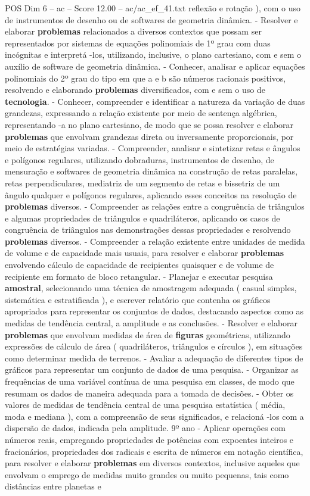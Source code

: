 \begin{textsample}{POS Dim 6 – ac – Score 12.00 – ac/ac\_ef\_41.txt}
reflexão e rotação ), com o uso de instrumentos de desenho ou de softwares de geometria dinâmica. - Resolver e elaborar \textbf{problemas} relacionados a diversos contextos que possam ser representados por sistemas de equações polinomiais de 1º grau com duas incógnitas e interpretá -los, utilizando, inclusive, o plano cartesiano, com e sem o auxílio de software de geometria dinâmica. - Conhecer, analisar e aplicar equações polinomiais do 2º grau do tipo em que a e b são números racionais positivos, resolvendo e elaborando \textbf{problemas} diversificados, com e sem o uso de \textbf{tecnologia}. - Conhecer, compreender e identificar a natureza da variação de duas grandezas, expressando a relação existente por meio de sentença algébrica, representando -a no plano cartesiano, de modo que se possa resolver e elaborar \textbf{problemas} que envolvam grandezas direta ou inversamente proporcionais, por meio de estratégias variadas. - Compreender, analisar e sintetizar retas e ângulos e polígonos regulares, utilizando dobraduras, instrumentos de desenho, de mensuração e softwares de geometria dinâmica na construção de retas paralelas, retas perpendiculares, mediatriz de um segmento de retas e bissetriz de um ângulo qualquer e polígonos regulares, aplicando esses conceitos na resolução de \textbf{problemas} diversos. - Compreender as relações entre a congruência de triângulos e algumas propriedades de triângulos e quadriláteros, aplicando os casos de congruência de triângulos nas demonstrações dessas propriedades e resolvendo \textbf{problemas} diversos. - Compreender a relação existente entre unidades de medida de volume e de capacidade mais usuais, para resolver e elaborar \textbf{problemas} envolvendo cálculo de capacidade de recipientes quaisquer e de volume de recipiente em formato de bloco retangular. - Planejar e executar pesquisa \textbf{amostral}, selecionando uma técnica de amostragem adequada ( casual simples, sistemática e estratificada ), e escrever relatório que contenha os gráficos apropriados para representar os conjuntos de dados, destacando aspectos como as medidas de tendência central, a amplitude e as conclusões. - Resolver e elaborar \textbf{problemas} que envolvam medidas de área de \textbf{figuras} geométricas, utilizando expressões de cálculo de área ( quadriláteros, triângulos e círculos ), em situações como determinar medida de terrenos. - Avaliar a adequação de diferentes tipos de gráficos para representar um conjunto de dados de uma pesquisa. - Organizar as frequências de uma variável contínua de uma pesquisa em classes, de modo que resumam os dados de maneira adequada para a tomada de decisões. - Obter os valores de medidas de tendência central de uma pesquisa estatística ( média, moda e mediana ), com a compreensão de seus significados, e relacioná -los com a dispersão de dados, indicada pela amplitude. 9º ano - Aplicar operações com números reais, empregando propriedades de potências com expoentes inteiros e fracionários, propriedades dos radicais e escrita de números em notação científica, para resolver e elaborar \textbf{problemas} em diversos contextos, inclusive aqueles que envolvam o emprego de medidas muito grandes ou muito pequenas, tais como distâncias entre planetas e 
\end{textsample}

